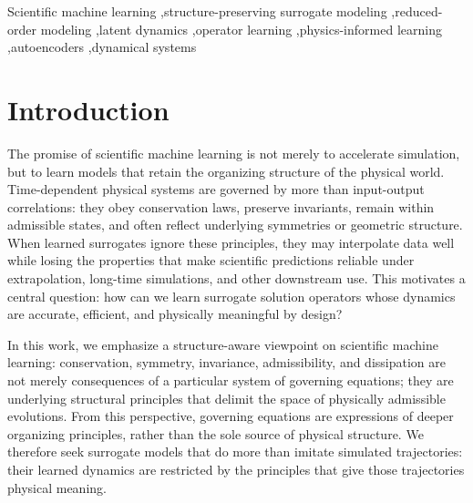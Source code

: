 \documentclass[a4paper,fleqn]{cas-sc}
\theoremstyle{thmstyleone}%
\theoremstyle{thmstyletwo}%
\theoremstyle{thmstylethree}%
\begin{document}


\begin{keywords}
Scientific machine learning \sep structure-preserving surrogate modeling \sep reduced-order modeling \sep latent dynamics \sep operator learning \sep physics-informed learning \sep autoencoders \sep dynamical systems
\end{keywords}

\maketitle

\section{Introduction}\label{sec:introduction}

The promise of scientific machine learning is not merely to accelerate simulation, but to learn models that retain the organizing structure of the physical world. Time-dependent physical systems are governed by more than input-output correlations: they obey conservation laws, preserve invariants, remain within admissible states, and often reflect underlying symmetries or geometric structure. When learned surrogates ignore these principles, they may interpolate data well while losing the properties that make scientific predictions reliable under extrapolation, long-time simulations, and other downstream use. This motivates a central question: how can we learn surrogate solution operators whose dynamics are accurate, efficient, and physically meaningful by design?

In this work, we emphasize a structure-aware viewpoint on scientific machine learning: conservation, symmetry, invariance, admissibility, and dissipation are not merely consequences of a particular system of governing equations; they are underlying structural principles that delimit the space of physically admissible evolutions. From this perspective, governing equations are expressions of deeper organizing principles, rather than the sole source of physical structure. We therefore seek surrogate models that do more than imitate simulated trajectories: their learned dynamics are restricted by the principles that give those trajectories physical meaning.
\end{document}
